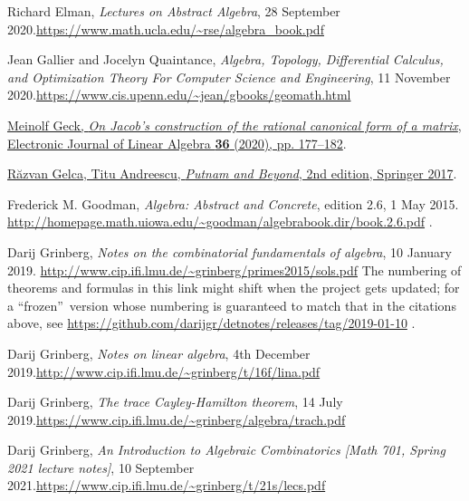 \documentclass[numbers=enddot,12pt,final,onecolumn,notitlepage]{scrartcl}%
\numberwithin{exer}{subsection}
\theoremstyle{definition}
\begin{document}
\begin{thebibliography}{99999999}
Richard Elman, \textit{Lectures on Abstract
Algebra}, 28 September 2020.\newline\url{https://www.math.ucla.edu/~rse/algebra_book.pdf}

Jean Gallier and Jocelyn Quaintance,
\textit{Algebra, Topology, Differential Calculus, and Optimization Theory For
Computer Science and Engineering}, 11 November 2020.\newline\url{https://www.cis.upenn.edu/~jean/gbooks/geomath.html}

\href{https://doi.org/10.13001/ela.2020.5055}{Meinolf
Geck, \textit{On Jacob's construction of the rational canonical form of a
matrix}, Electronic Journal of Linear Algebra \textbf{36} (2020), pp.
177--182}.

%
\href{https://doi.org/10.1007/978-3-319-58988-6}{R\u{a}zvan Gelca, Titu
Andreescu, \textit{Putnam and Beyond}, 2nd edition, Springer 2017}.

Frederick M. Goodman, \textit{Algebra: Abstract and
Concrete}, edition 2.6, 1 May 2015.\newline%
\url{http://homepage.math.uiowa.edu/~goodman/algebrabook.dir/book.2.6.pdf} .

Darij Grinberg, \textit{Notes on the combinatorial
fundamentals of algebra}, 10 January 2019.\newline%
\url{http://www.cip.ifi.lmu.de/~grinberg/primes2015/sols.pdf} \newline The
numbering of theorems and formulas in this link might shift when the project
gets updated; for a \textquotedblleft frozen\textquotedblright\ version whose
numbering is guaranteed to match that in the citations above, see
\url{https://github.com/darijgr/detnotes/releases/tag/2019-01-10} .

Darij Grinberg, \textit{Notes on linear algebra}, 4th
December 2019.\newline\url{http://www.cip.ifi.lmu.de/~grinberg/t/16f/lina.pdf}

Darij Grinberg, \textit{The trace Cayley-Hamilton
theorem}, 14 July 2019.\newline\url{https://www.cip.ifi.lmu.de/~grinberg/algebra/trach.pdf}

Darij Grinberg, \textit{An Introduction to Algebraic
Combinatorics [Math 701, Spring 2021 lecture notes]}, 10 September
2021.\newline\url{https://www.cip.ifi.lmu.de/~grinberg/t/21s/lecs.pdf}


\end{thebibliography}
\end{document}
